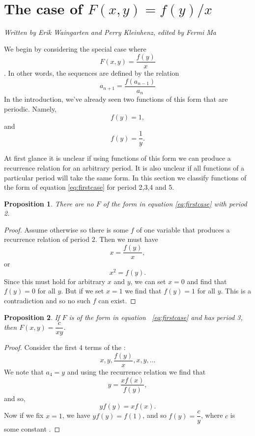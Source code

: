 \documentclass[12pt]{article}
\newtheorem{proposition}{Proposition}
\begin{document}
\section{The case of $F(x,y) = f(y)/x$}
\emph{Written by Erik Waingarten and Perry Kleinhenz, edited by Fermi Ma}

We begin by considering the special case where
\begin{equation}\label{eq:firstcase}
F(x,y) = \dfrac{f(y)}{x}
\end{equation}. 
In other words, the sequences are defined by the relation
\begin{equation*}
a_{n+1} = \dfrac{f(a_{n-1})}{a_n}
\end{equation*}
In the introduction, we've already seen two functions of this form that are periodic. Namely, $$f(y) = 1,$$ and $$f(y) = \frac{1}{y}.$$

At first glance it is unclear if using functions of this form we can produce a recurrence relation for an arbitrary period. It is also unclear if all functions of a particular period will take the same form. In this section we classify functions of the form of equation \ref{eq:firstcase} for period 2,3,4 and 5. 

\begin{proposition} 
There are no $F$ of the form in equation \ref{eq:firstcase} with period 2.
\end{proposition}
\begin{proof}
Assume otherwise so there is some $f$ of one variable that produces a recurrence relation of period 2. Then we must have 
\begin{equation*}
x = \frac{f(y)}{x},
\end{equation*}
or 
\begin{equation*}
x^2 = f(y).
\end{equation*}
Since this must hold for arbitrary $x$ and $y$, we can set $x=0$ and find that $f(y)=0$ for all $y$. But if we set $x=1$ we find that $f(y)=1$ for all $y$. This is a contradiction and so no such $f$ can exist.
\end{proof}



\begin{proposition}
If $F$ is of the form in equation ~\ref{eq:firstcase} and has period 3, then $F(x,y) = \dfrac{c}{xy}$.
\end{proposition}

\begin{proof}
Consider the first 4 terms of the :
\begin{equation*}
x, y, \dfrac{f(y)}{x}, x, y, \dots 
\end{equation*}
We note that $a_4=y$ and using the recurrence relation we find that 
\begin{equation*}
y = \dfrac{xf(x)}{f(y)},
\end{equation*}
and so,
\begin{equation*} 
y f(y) = x f(x).
\end{equation*}
Now if we fix $x = 1$, we have $y f(y) = f(1)$, and so $f(y) = \dfrac{c}{y}$, where $c$ is some constant .
\end{proof}
\end{document}

